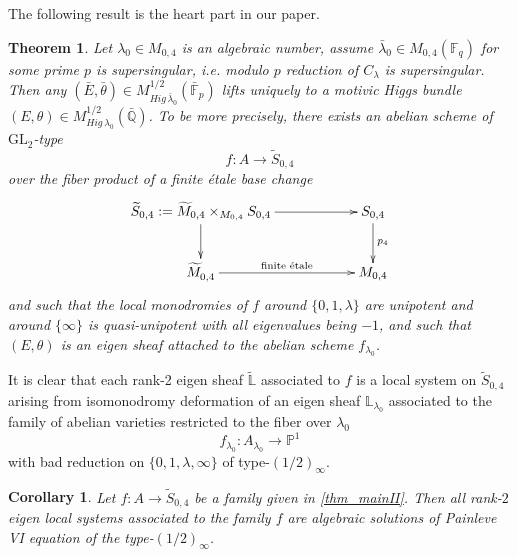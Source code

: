 \documentclass[12pt,twoside]{book}
\theoremstyle{plain}
\newtheorem{theorem}{Theorem}[section]
\newtheorem{corollary}[corollary]{Corollary}
\theoremstyle{definition}
\theoremstyle{remark}
\numberwithin{equation}{section}
\begin{document}
The following result is the heart part in our paper.
\begin{theorem} \label{thm_mainII}
Let $\lambda_0 \in M_{0,4}$ is an algebraic number, assume $\bar \lambda_0\in M_{0,4}(\mathbb F_q)$ for some prime $p$ is supersingular, i.e. modulo $p$ reduction of $C_\lambda$ is supersingular. Then any
$(\bar E, \bar \theta)\in M^{1/2}_{Hig\, \bar \lambda_0}(\bar {\mathbb F}_p)$ lifts uniquely to a motivic Higgs bundle
$(E,\theta)\in M^{1/2}_{Hig\, \lambda_0}(\bar {\mathbb Q})$. To be more precisely, there exists an abelian scheme of $\text{GL}_2$-type
$$f: A\to \tilde S_{0,4}$$
over the fiber product of a finite \'etale base change
\begin{equation*}
\xymatrix@C=2cm{
\widetilde{S}_{0,4}:=\widetilde {M}_{0,4} \times_{M_{0,4}} S_{0,4} \ar[r] \ar[d] & {S}_{0,4} \ar[d]^{p_4}\\
\widetilde {M}_{0,4}^{} \ar[r]^{\text{finite \'etale}} & M_{0,4}\\
}
\end{equation*}
and such that the local monodromies of $f$ around $\{0,1,\lambda\}$ are unipotent and around $\{\infty\}$ is quasi-unipotent with all eigenvalues being $-1$,  and such that
$(E,\theta)$ is an eigen sheaf attached to the abelian scheme $f_{\lambda_0}$.
\end{theorem}




It is clear that each rank-2 eigen sheaf $\tilde{\mathbb L}$ associated to $f$ is a local system on $\tilde S_{0,4}$ arising from isomonodromy deformation of an eigen sheaf $\mathbb L_{\lambda_0}$ associated to the family of abelian varieties restricted to the fiber over $\lambda_0$
$$f_{\lambda_0} : A_{\lambda_0}\to \mathbb P^1$$
with bad reduction on $\{0,1,\lambda,\infty\}$ of type-$(1/2)_\infty$.
\begin{corollary} \label{thm_main_painleve}
 Let $f\colon A\to\widetilde S_{0,4}$ be a family given in \autoref{thm_mainII}. Then all rank-$2$ eigen local systems associated to the family $f$ are algebraic solutions of Painleve VI equation of the type-$(1/2)_\infty$.
\end{corollary}
\end{document}
